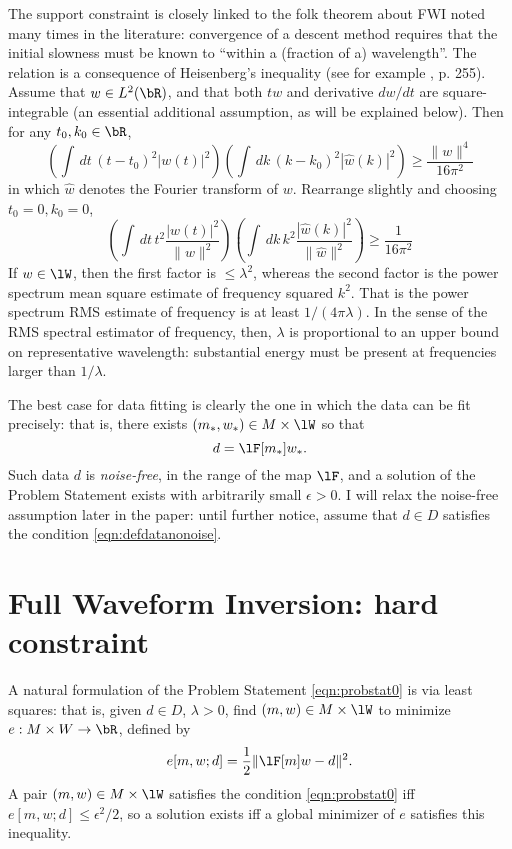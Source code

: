 The support constraint is closely linked to the folk theorem about FWI noted many
times in the literature: convergence of a descent method requires that
the initial slowness must be known to ``within a (fraction of a) wavelength''. The
relation is a consequence of Heisenberg's inequality
(see for example \cite{Folland:07}, p. 255). Assume that $w \in L^2(\bR)$, and that both $tw$ and derivative $dw/dt$ are
square-integrable (an essential additional assumption, as will be
explained below). Then for any $t_0, k_0 \in \bR$,
\[
  \left(\int\,dt\, (t-t_0)^2|w(t)|^2\right)
  \left(\int\,dk\,(k-k_0)^2|\hat{w}(k)|^2\right)
  \ge\frac{\|w\|^4}{16 \pi^2}
\]
in which $\hat{w}$ denotes the Fourier transform of $w$. Rearrange
slightly and choosing $t_0=0, k_0=0$,
\[
  \left(\int\,dt\, t^2\frac{|w(t)|^2}{\|w\|^2}\right)
  \left(\int\,dk\,k^2\frac{|\hat{w}(k)|^2}{\|\hat{w}\|^2}\right)
  \ge\frac{1}{16 \pi^2}
\]
If $w \in \lW$, then the first factor is $\le \lambda^2$, whereas the
second factor is the power spectrum mean square estimate of
frequency squared $k^2$. That is the power spectrum RMS estimate of
frequency is at least $1/(4 \pi \lambda)$. In the sense of the RMS
spectral estimator of frequency, then, $\lambda$ is proportional to an upper
bound on representative wavelength: substantial energy must be present
at frequencies larger than $1/\lambda$.

The best case for data fitting is clearly the one in which the data
can be fit precisely: that is, there exists $(m_*,w_*) \in M\times \lW$ so that
\begin{equation}
  \label{eqn:defdatanonoise}
  d=\lF[m_*]w_*.
\end{equation}
Such data $d$ is {\em noise-free}, in the range of the map $\lF$, and a solution of the Problem Statement
exists with arbitrarily small $\epsilon>0$. I will relax the noise-free assumption
later in the paper: until further notice, assume that $d \in
D$ satisfies the condition \ref{eqn:defdatanonoise}.

\section{Full Waveform Inversion: hard constraint}
A natural formulation of the Problem Statement \ref{eqn:probstat0} is
via least squares: that is, given $d \in D$, $\lambda >0$, find $(m,w)
\in M \times \lW$ to minimize $e: M \times W
 \rightarrow \bR$, defined by
\begin{equation}
  \label{eqn:FWI}
  e[m,w;d] = \frac{1}{2}\|\lF[m]w-d\|^2.
\end{equation}
A pair $(m,w) \in M\times \lW$
satisfies the condition \ref{eqn:probstat0} iff $e[m,w;d] \le \epsilon^2/2$, so a solution exists iff a 
global minimizer of $e$ satisfies this inequality.

